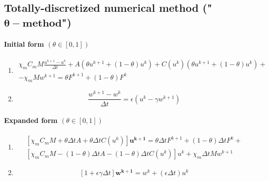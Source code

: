 \documentclass[a4paper]{article}
\begin{document}
\subsection{Totally-discretized numerical method ("$\bm{\theta-method}$")}
\vspace{5mm}
\paragraph{Initial form $(\theta \in [0,1])$}
\begin{enumerate}
	\item
	\begin{equation}
	\begin{gathered}
	\chi_mC_m M \frac{u^{k+1}-u^k}{\Delta t} +  A \left(\theta u^{k+1} + (1-\theta)u^k \right) + C(u^k)\left(\theta u^{k+1} + (1-\theta)u^k \right) +
	\\ -\chi_mMw^{k+1}=\theta F^{k+1} + (1-\theta)F^k
	\end{gathered}
	\end{equation}
	\item
	\begin{equation}
	\frac{w^{k+1}- w^{k}}{\Delta t} = \epsilon(u^k-\gamma w^{k+1})
	\end{equation}
\end{enumerate}
\vspace{3mm}
\paragraph{Expanded form $(\theta \in [0,1])$}
\begin{enumerate}
	\item
	\begin{equation}
	\begin{gathered}
	\left[\chi_mC_mM+\theta \Delta t A + \theta \Delta t C(u^k) \right] \bm{u^{k+1}} = \theta\Delta t F^{k+1} + (1-\theta)\Delta tF^k +
	\\
	\left[\chi_mC_mM- (1-\theta)\Delta t A - (1-\theta)\Delta t C(u^k)\right] u^k +\chi_m\Delta t Mw^{k+1} 
	\end{gathered}
	\end{equation}
	\item
	\begin{equation}
	\left[1+ \epsilon \gamma \Delta t\right] \bm{w^{k+1}} = w^k + (\epsilon \Delta t) u^k
	\end{equation}
\end{enumerate}
\end{document}
